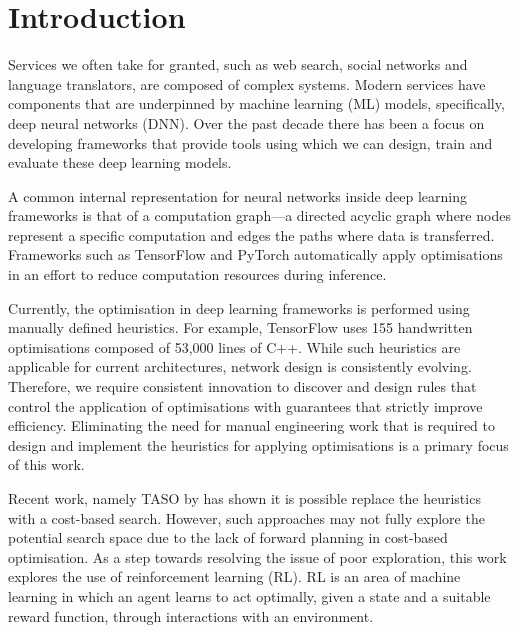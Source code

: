 \chapter{Introduction}

Services we often take for granted, such as web search, social networks and language translators, are composed of complex systems. Modern services have components that are underpinned by machine learning (ML) models, specifically, deep neural networks (DNN). Over the past decade there has been a focus on developing frameworks that provide tools using which we can design, train and evaluate these deep learning models.

A common internal representation for neural networks inside deep learning frameworks is that of a computation graph---a directed acyclic graph where nodes represent a specific computation and edges the paths where data is transferred. Frameworks such as TensorFlow \cite{tensorflow2015-whitepaper} and PyTorch \cite{pytorch} automatically apply optimisations in an effort to reduce computation resources during inference.

Currently, the optimisation in deep learning frameworks is performed using manually defined heuristics. For example, TensorFlow \cite{tensorflow2015-whitepaper} uses 155 handwritten optimisations composed of 53,000 lines of C++. While such heuristics are applicable for current architectures, network design is consistently evolving. Therefore, we require consistent innovation to discover and design rules that control the application of optimisations with guarantees that strictly improve efficiency. Eliminating the need for manual engineering work that is required to design and implement the heuristics for applying optimisations is a primary focus of this work.

Recent work, namely TASO by \citet{jia2019taso,jia2019optimizing} has shown it is possible replace the heuristics with a cost-based search. However, such approaches may not fully explore the potential search space due to the lack of forward planning in cost-based optimisation. As a step towards resolving the issue of poor exploration, this work explores the use of reinforcement learning (RL). RL is an area of machine learning in which an agent learns to act optimally, given a state and a suitable reward function, through interactions with an environment.


